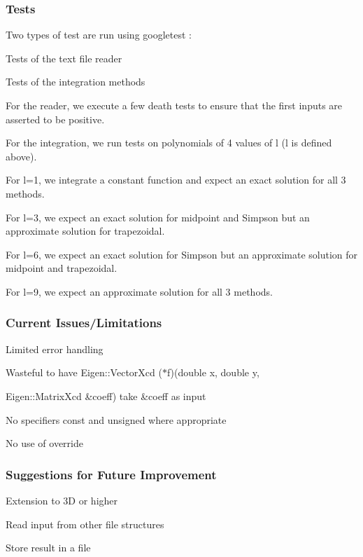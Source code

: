 \subsubsection*{Tests}

Two types of test are run using googletest \+:
\begin{DoxyItemize}
\item Tests of the text file reader
\item Tests of the integration methods
\end{DoxyItemize}

For the reader, we execute a few death tests to ensure that the first inputs are asserted to be positive.

For the integration, we run tests on polynomials of 4 values of l (l is defined above).
\begin{DoxyItemize}
\item For l=1, we integrate a constant function and expect an exact solution for all 3 methods.
\item For l=3, we expect an exact solution for midpoint and Simpson but an approximate solution for trapezoidal.
\item For l=6, we expect an exact solution for Simpson but an approximate solution for midpoint and trapezoidal.
\item For l=9, we expect an approximate solution for all 3 methods.
\end{DoxyItemize}

\subsubsection*{Current Issues/\+Limitations}


\begin{DoxyItemize}
\item Limited error handling
\item Wasteful to have Eigen\+::\+Vector\+Xcd ($\ast$f)(double x, double y,
\item Eigen\+::\+Matrix\+Xcd \&coeff) take \&coeff as input
\item No specifiers const and unsigned where appropriate
\item No use of override
\end{DoxyItemize}

\subsubsection*{Suggestions for Future Improvement}


\begin{DoxyItemize}
\item Extension to 3D or higher
\item Read input from other file structures
\item Store result in a file 
\end{DoxyItemize}